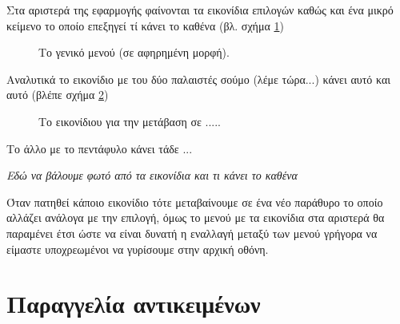 \documentclass[a4paper,titlepage,twoside,12pt,leqno]{article}
\begin{document}
Στα αριστερά της εφαρμογής φαίνονται τα εικονίδια επιλογών καθώς και ένα μικρό κείμενο το οποίο επεξηγεί τί κάνει το καθένα (βλ. σχήμα \ref{fig:menu:general})

\begin{figure}
\begin{center}
\caption{Το γενικό μενού (σε αφηρημένη μορφή).}
\label{fig:menu:general}
\end{center}
\end{figure}

Αναλυτικά το εικονίδιο με του δύο παλαιστές σούμο (λέμε τώρα...) κάνει αυτό και αυτό (βλέπε σχήμα \ref{fig:icon:})

\begin{figure}
\begin{center}
\resizebox*{10.5cm}{!}{
\rule{0.4\textwidth}{0.3\textwidth}}
\caption{Το εικονίδιου για την μετάβαση σε .....}
\label{fig:icon:}
\end{center}
\end{figure}

Το άλλο με το πεντάφυλο κάνει τάδε ...

\emph{Εδώ να βάλουμε φωτό από τα εικονίδια και τι κάνει το καθένα}

Όταν πατηθεί κάποιο εικονίδιο τότε μεταβαίνουμε σε ένα νέο παράθυρο το οποίο αλλάζει ανάλογα με την επιλογή, όμως το μενού με τα εικονίδια στα αριστερά θα παραμένει έτσι ώστε να είναι δυνατή η εναλλαγή μεταξύ των μενού γρήγορα να είμαστε υποχρεωμένοι να γυρίσουμε στην αρχική οθόνη.

\section{Παραγγελία αντικειμένων}
\label{paraggelia}
\end{document}
